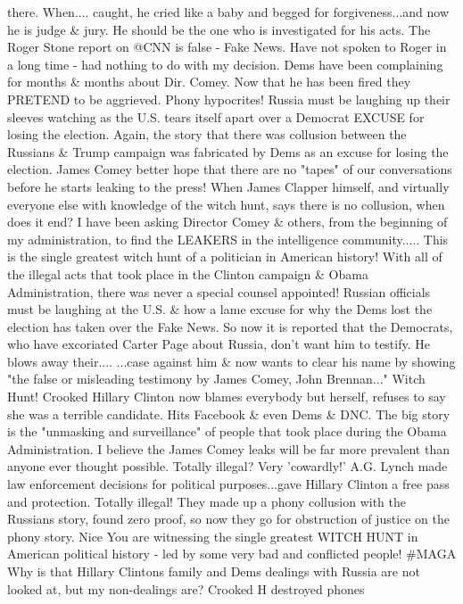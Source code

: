 there. When.... caught, he cried like a baby and begged for
forgiveness...and now he is judge \& jury. He should be the one who is
investigated for his acts. The Roger Stone report on @CNN is false -
Fake News. Have not spoken to Roger in a long time - had nothing to do
with my decision. Dems have been complaining for months \& months about
Dir. Comey. Now that he has been fired they PRETEND to be aggrieved.
Phony hypocrites! Russia must be laughing up their sleeves watching as
the U.S. tears itself apart over a Democrat EXCUSE for losing the
election. Again, the story that there was collusion between the Russians
\& Trump campaign was fabricated by Dems as an excuse for losing the
election. James Comey better hope that there are no "tapes" of our
conversations before he starts leaking to the press! When James Clapper
himself, and virtually everyone else with knowledge of the witch hunt,
says there is no collusion, when does it end? I have been asking
Director Comey \& others, from the beginning of my administration, to
find the LEAKERS in the intelligence community..... This is the single
greatest witch hunt of a politician in American history! With all of the
illegal acts that took place in the Clinton campaign \& Obama
Administration, there was never a special counsel appointed! Russian
officials must be laughing at the U.S. \& how a lame excuse for why the
Dems lost the election has taken over the Fake News. So now it is
reported that the Democrats, who have excoriated Carter Page about
Russia, don't want him to testify. He blows away their.... ...case
against him \& now wants to clear his name by showing "the false or
misleading testimony by James Comey, John Brennan..." Witch Hunt!
Crooked Hillary Clinton now blames everybody but herself, refuses to say
she was a terrible candidate. Hits Facebook \& even Dems \& DNC. The big
story is the "unmasking and surveillance" of people that took place
during the Obama Administration. I believe the James Comey leaks will be
far more prevalent than anyone ever thought possible. Totally illegal?
Very 'cowardly!' A.G. Lynch made law enforcement decisions for political
purposes...gave Hillary Clinton a free pass and protection. Totally
illegal! They made up a phony collusion with the Russians story, found
zero proof, so now they go for obstruction of justice on the phony
story. Nice You are witnessing the single greatest WITCH HUNT in
American political history - led by some very bad and conflicted people!
\#MAGA Why is that Hillary Clintons family and Dems dealings with Russia
are not looked at, but my non-dealings are? Crooked H destroyed phones
